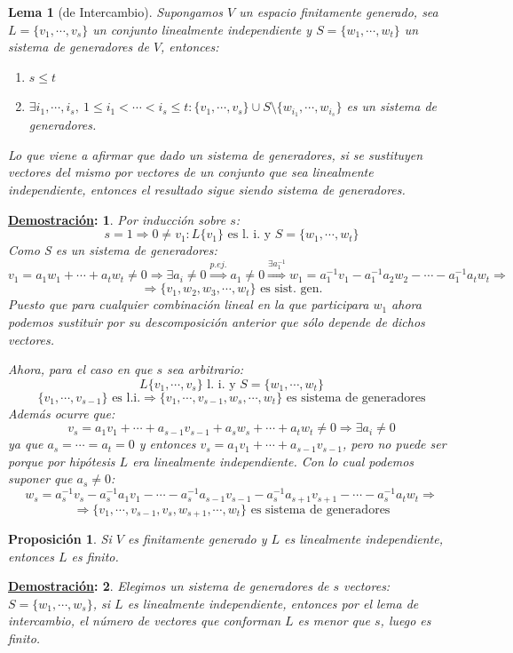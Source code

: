 \documentclass[10pt,a4paper,openright]{book}
\theoremstyle{break}
\newtheorem*{lema}{Lema}
\newtheorem*{prop}{Proposición}
\newtheorem*{demo}{\underline{Demostración}:}
\begin{document}
\begin{lema}[de Intercambio]
Supongamos $V$ un espacio finitamente generado, sea $L=\{v_1, \cdots, v_s\}$ un conjunto linealmente independiente y $S=\{w_1, \cdots, w_t\}$ un sistema de generadores de $V$, entonces:
\begin{enumerate}
\item $s\leq t$
\item $\exists i_1, \cdots, i_s, \ 1\leq i_1<\cdots< i_s\leq t : \{v_1, \cdots, v_s\}\cup S\setminus\{w_{i_1}, \cdots, w_{i_s}\}$ es un sistema de generadores.
\end{enumerate}
Lo que viene a afirmar que dado un sistema de generadores, si se sustituyen vectores del mismo por vectores de un conjunto que sea linealmente independiente, entonces el resultado sigue siendo sistema de generadores.
\end{lema}
\begin{demo}
Por inducción sobre $s$:
$$s=1\Rightarrow 0\neq v_1: L\{v_1\}\mbox{ es l. i. y }S=\{w_1, \cdots, w_t\}$$
Como S es un sistema de generadores:
$$v_1=a_1w_1+\cdots+a_tw_t\neq 0\Rightarrow \exists a_i\neq 0\stackrel{p.ej.}{\Rightarrow} a_1\neq 0\stackrel{\exists a_1^{-1}}{\Rightarrow} w_1=a_1^{-1}v_1-a_1^{-1}a_2w_2-\cdots- a_1^{-1}a_tw_t\Rightarrow $$
$$\Rightarrow \{v_1, w_2, w_3, \cdots, w_t\}\mbox{ es sist. gen.}$$
Puesto que para cualquier combinación lineal en la que participara $w_1$ ahora podemos sustituir por su descomposición anterior que sólo depende de dichos vectores.

Ahora, para el caso en que $s$ sea arbitrario:
$$L\{v_1, \cdots, v_s\} \mbox{ l. i. y } S=\{w_1, \cdots, w_t\}$$
$$\{v_1, \cdots, v_{s-1}\}\mbox{ es l.i.}\Rightarrow \{v_1, \cdots, v_{s-1},w_s, \cdots,w_t\}\mbox{ es sistema de generadores}$$
Además ocurre que:
$$v_s=a_1v_1+\cdots+ a_{s-1}v_{s-1}+a_sw_s+\cdots+a_tw_t\neq 0\Rightarrow \exists a_i\neq 0$$
ya que $a_s=\cdots=a_t=0$ y entonces $v_s=a_1v_1+\cdots+a_{s-1}v_{s-1}$, pero no puede ser porque por hipótesis $L$ era linealmente independiente. Con lo cual podemos suponer que $a_s\neq 0$:
$$w_s= a_s^{-1}v_s-a_s^{-1}a_1v_1-\cdots-a_s^{-1}a_{s-1}v_{s-1}- a_s^{-1}a_{s+1}v_{s+1}-\cdots- a_s^{-1}a_tw_t\Rightarrow$$
$$\Rightarrow \{v_1, \cdots, v_{s-1}, v_s, w_{s+1}, \cdots, w_t\}\mbox{ es sistema de generadores} $$
\end{demo}

\begin{prop}
Si $V$ es finitamente generado y $L$ es linealmente independiente, entonces $L$ es finito.
\end{prop}
\begin{demo}
Elegimos un sistema de generadores de $s$ vectores: $S=\{w_1, \cdots, w_s\}$, si $L$ es linealmente independiente, entonces por el lema de intercambio, el número de vectores que conforman $L$ es menor que $s$, luego es finito.
\end{demo}
\end{document}
